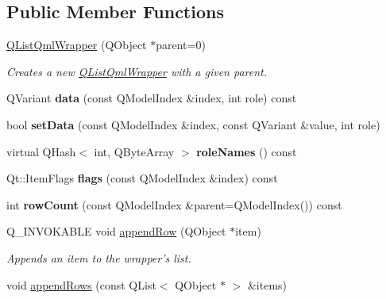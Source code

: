 \subsection*{Public Member Functions}
\begin{DoxyCompactItemize}
\item 
\hyperlink{classQListQmlWrapper_aeef385347fe1fc0c299f26046652a56c}{Q\-List\-Qml\-Wrapper} (Q\-Object $\ast$parent=0)
\begin{DoxyCompactList}\small\item\em Creates a new \hyperlink{classQListQmlWrapper}{Q\-List\-Qml\-Wrapper} with a given parent. \end{DoxyCompactList}\item 
\hypertarget{classQListQmlWrapper_ad6bb3bc6cf1044720c77962ed3d028e2}{Q\-Variant {\bfseries data} (const Q\-Model\-Index \&index, int role) const }\label{classQListQmlWrapper_ad6bb3bc6cf1044720c77962ed3d028e2}

\item 
\hypertarget{classQListQmlWrapper_a9ecb0a6b14f74c75e5d871542a07c8ba}{bool {\bfseries set\-Data} (const Q\-Model\-Index \&index, const Q\-Variant \&value, int role)}\label{classQListQmlWrapper_a9ecb0a6b14f74c75e5d871542a07c8ba}

\item 
\hypertarget{classQListQmlWrapper_a38d2b1788b6943874cdc465dc437331c}{virtual Q\-Hash$<$ int, Q\-Byte\-Array $>$ {\bfseries role\-Names} () const }\label{classQListQmlWrapper_a38d2b1788b6943874cdc465dc437331c}

\item 
\hypertarget{classQListQmlWrapper_a382a39110f33537bff9f49d7c0fd4fdf}{Qt\-::\-Item\-Flags {\bfseries flags} (const Q\-Model\-Index \&index) const }\label{classQListQmlWrapper_a382a39110f33537bff9f49d7c0fd4fdf}

\item 
\hypertarget{classQListQmlWrapper_a156c45b9f122fea8394ec821f47c41fe}{int {\bfseries row\-Count} (const Q\-Model\-Index \&parent=Q\-Model\-Index()) const }\label{classQListQmlWrapper_a156c45b9f122fea8394ec821f47c41fe}

\item 
\hypertarget{classQListQmlWrapper_a78ba996cd2cff329e8cb6081e986b056}{Q\-\_\-\-I\-N\-V\-O\-K\-A\-B\-L\-E void \hyperlink{classQListQmlWrapper_a78ba996cd2cff329e8cb6081e986b056}{append\-Row} (Q\-Object $\ast$item)}\label{classQListQmlWrapper_a78ba996cd2cff329e8cb6081e986b056}

\begin{DoxyCompactList}\small\item\em Appends an item to the wrapper's list. \end{DoxyCompactList}\item 
\hypertarget{classQListQmlWrapper_ae580eaadaa6abb6f5f9ca6bbb5b91fa6}{void \hyperlink{classQListQmlWrapper_ae580eaadaa6abb6f5f9ca6bbb5b91fa6}{append\-Rows} (const Q\-List$<$ Q\-Object $\ast$ $>$ \&items)}\label{classQListQmlWrapper_ae580eaadaa6abb6f5f9ca6bbb5b91fa6}


\end{DoxyCompactItemize}
